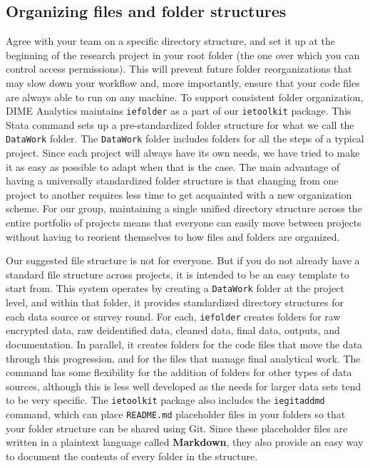 \subsection{Organizing files and folder structures}

Agree with your team on a specific directory structure,
and set it up at the beginning of the research project
in your root folder (the one over which you can control access permissions).
This will prevent future folder reorganizations that may slow down your workflow and,
more importantly, ensure that your code files are always able to run on any machine.
To support consistent folder organization, DIME Analytics maintains \texttt{iefolder}
as a part of our \texttt{ietoolkit} package.
This Stata command sets up a pre-standardized folder structure
for what we call the \texttt{DataWork} folder.
The \texttt{DataWork} folder includes folders for all the steps of a typical project.
Since each project will always have its own needs,
we have tried to make it as easy as possible to adapt when that is the case.
The main advantage of having a universally standardized folder structure
is that changing from one project to another requires less
time to get acquainted with a new organization scheme.
For our group, maintaining a single unified directory structure
across the entire portfolio of projects means that everyone
can easily move between projects without having to reorient
themselves to how files and folders are organized.

Our suggested file structure is not for everyone.
But if you do not already have a standard file structure across projects,
it is intended to be an easy template to start from.
This system operates by creating a \texttt{DataWork} folder at the project level,
and within that folder, it provides standardized directory structures
for each data source or survey round.
For each, \texttt{iefolder} creates folders for raw encrypted data,
raw deidentified data, cleaned data, final data, outputs, and documentation.
In parallel, it creates folders for the code files
that move the data through this progression,
and for the files that manage final analytical work.
The command has some flexibility for the addition of
folders for other types of data sources, although this is less well developed
as the needs for larger data sets tend to be very specific.
The \texttt{ietoolkit} package also includes the \texttt{iegitaddmd} command,
which can place \texttt{README.md} placeholder files in your folders so that
your folder structure can be shared using Git. Since these placeholder files are
written in a plaintext language called \textbf{Markdown}, they also provide an easy way
to document the contents of every folder in the structure.

